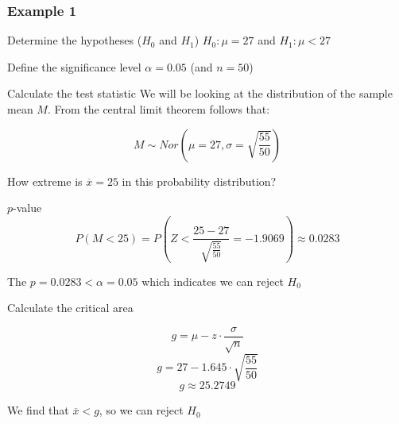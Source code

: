 \documentclass{beamer}
\begin{document}
\begin{frame}
  \frametitle{Example 1}
  \begin{block}{Determine the hypotheses ($H_0$ and $H_1$)}
    $H_{0} : \mu = 27$ and $H_{1}: \mu < 27$
  \end{block}


  \begin{block}{Define the significance level}
  $\alpha = 0.05$ (and $n=50$)
  \end{block}


  \begin{block}{Calculate the test statistic}
    We will be looking at the distribution of the sample mean $M$. From the central limit theorem follows that:

    \[ M \sim Nor(\mu = 27, \sigma = \sqrt{\frac{55}{50}}) \]
    
    How extreme is $\overline{x}= 25$ in this probability distribution?
  \end{block}
\end{frame}

\begin{frame}
  \begin{block}{$p$-value}
    \[ P(M < 25) = P \left(Z < \frac{25 - 27}{\sqrt{\frac{55}{50}}} = -1.9069 \right) \approx 0.0283  \]
    
    The $p = 0.0283 < \alpha = 0.05$ which indicates we can reject  $H_{0}$
    \end{block}
  
    \begin{block}{Calculate the critical area}
    
    \[ g = \mu - z \cdot \frac{\sigma}{\sqrt{n}} \]
    \[ g = 27 - 1.645 \cdot \sqrt{\frac{55}{50}} \]
    \[ g \approx 25.2749 \]
  
    We find that $\overline{x} < g$, so we can reject $H_{0}$
  \end{block}

\end{frame}

\begin{frame}
    \centering
\end{frame}
\end{document}
